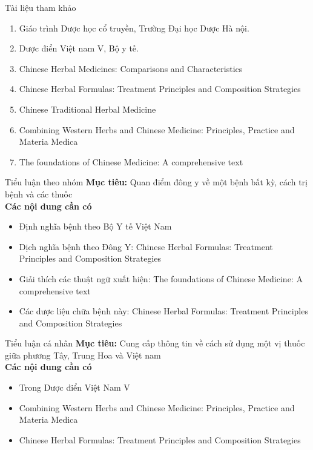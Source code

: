 \documentclass[
	11pt, %
]{beamer}
\theoremstyle{newblock}
\begin{document}
\begin{frame}{Tài liệu tham khảo}
	\begin{enumerate}
		\item Giáo trình Dược học cổ truyền, Trường Đại học Dược Hà nội.
		\item Dược điển Việt nam V, Bộ y tế.
		\item Chinese Herbal Medicines: Comparisons and Characteristics
		\item Chinese Herbal Formulas: Treatment Principles and Composition Strategies
		\item Chinese Traditional Herbal Medicine
		\item Combining Western Herbs and Chinese Medicine: Principles, Practice and Materia Medica
		\item The foundations of Chinese Medicine: A comprehensive text
	\end{enumerate}
\end{frame}
\begin{frame}{Tiểu luận theo nhóm}{}
	{\bf Mục tiêu:} Quan điểm đông y về một bệnh bất kỳ, cách trị bệnh và các thuốc\\
	{\bf Các nội dung cần có}
	\begin{itemize}
		\item Định nghĩa bệnh theo Bộ Y tế Việt Nam 
		\item Dịch nghĩa bệnh theo Đông Y: Chinese Herbal Formulas: Treatment Principles and Composition Strategies
		\item Giải thích các thuật ngữ xuất hiện: The foundations of Chinese Medicine: A comprehensive text
		\item Các dược liệu chữa bệnh này: Chinese Herbal Formulas: Treatment Principles and Composition Strategies
	\end{itemize}
\end{frame}
\begin{frame}{Tiểu luận cá nhân}{}
	{\bf Mục tiêu:} Cung cấp thông tin về cách sử dụng một vị thuốc giữa phương Tây, Trung Hoa và Việt nam\\
	{\bf Các nội dung cần có}
	\begin{itemize}
		\item Trong Dược điển Việt Nam V
		\item Combining Western Herbs and Chinese Medicine: Principles, Practice and Materia Medica
		\item Chinese Herbal Formulas: Treatment Principles and Composition Strategies
	\end{itemize}
\end{frame}	
\end{document}

